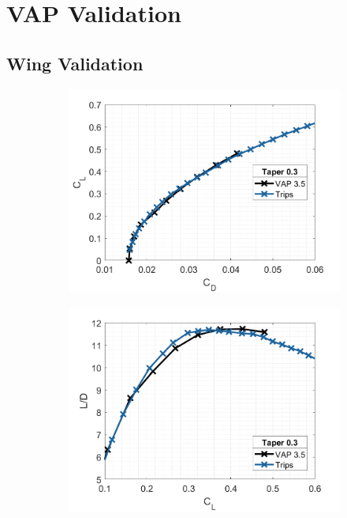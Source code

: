 \section{VAP Validation}

\subsection{Wing Validation}


\begin{figure}[H]
     \centering
     \begin{subfigure}[b]{0.45\textwidth}
         \centering
         \includegraphics[width=\textwidth]{05_Results/Figs/VAP/genMAV/taper3a.png}

     \end{subfigure}
     \hfill
     \begin{subfigure}[b]{0.45\textwidth}
         \centering
         \includegraphics[width=\textwidth]{05_Results/Figs/VAP/genMAV/taper3b.png}
      
     \end{subfigure}
     \hfill

        
\end{figure}


